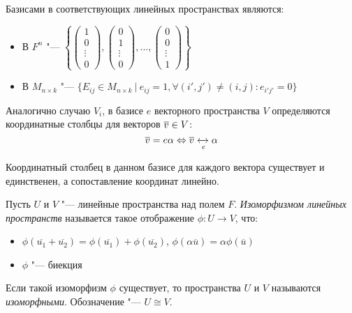 \begin{example}
	Базисами в соответствующих линейных пространствах являются:
	\begin{itemize}
		\item В $F^n$ "--- $\left\{\begin{pmatrix}1\\0\\\vdots\\0\end{pmatrix}, \begin{pmatrix}0\\1\\\vdots\\0\end{pmatrix},\dots, \begin{pmatrix}0\\0\\\vdots\\1\end{pmatrix}\right\}$
		\item В $M_{n \times k}$ "--- $\{E_{ij} \in M_{n \times k}~|~e_{ij} = 1, \forall (i',j') \ne (i, j): e_{i'j'} = 0\}$
	\end{itemize}
\end{example}

\begin{note}
	Аналогично случаю $V_i$, в базисе $e$ векторного пространства $V$ определяются координатные столбцы для векторов $\overline{v} \hm{\in} V$:
	\[\overline{v} = e\alpha \Leftrightarrow \overline{v} \xleftrightarrow[e]{} \alpha\]
	
	Координатный столбец в данном базисе для каждого вектора существует и единственен, а сопоставление координат линейно.
\end{note}

\begin{definition}
	Пусть $U$ и $V$ "--- линейные пространства над полем $F$. \textit{Изоморфизмом линейных пространств} называется такое отображение $\phi: U \rightarrow V$, что:
	\begin{itemize}
		\item $\phi(\overline{u_1} + \overline{u_2}) = \phi(\overline{u_1}) + \phi(\overline{u_2})$, $\phi(\alpha\overline{u}) = \alpha\phi(\overline{u})$
		\item $\phi$ "--- биекция
	\end{itemize}

	Если такой изоморфизм $\phi$ существует, то пространства $U$ и $V$ называются \textit{изоморфными}. Обозначение "--- $U \cong V$.
\end{definition}

